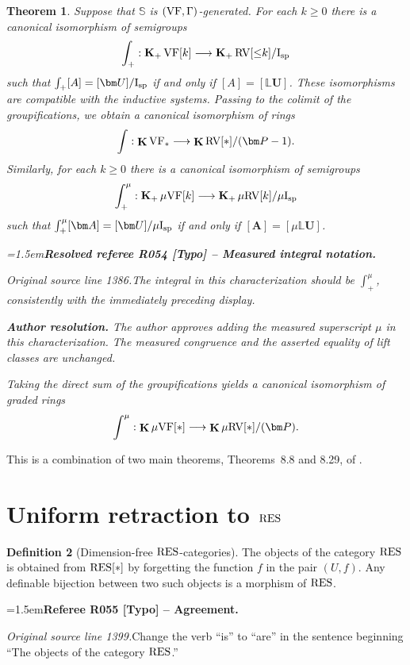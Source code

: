 \documentclass[12pt]{amsart}
\newcommand{\RefereeRemark}[4]{%
  \par\medskip\begingroup\normalfont\small\color{RefereePurple}%
  \emergencystretch=1.5em\noindent\textbf{Referee R#1 [#2] -- #3.}\par\nobreak\noindent #4\par
  \endgroup\medskip
}
\newcommand{\ResolvedRefereeRemark}[5]{%
  \par\medskip\begingroup\normalfont\small\color{gray}%
  \emergencystretch=1.5em\noindent\textbf{Resolved referee R#1 [#2] -- #3.}\par\nobreak\noindent #4\par
  \medskip\color{ResolutionGreen}\noindent\textbf{Author resolution.} #5\par
  \endgroup\medskip
}
\theoremstyle{plain}
\newtheorem{thm}{Theorem}[section]
\theoremstyle{definition}
\newtheorem{defn}[thm]{Definition}
\theoremstyle{remark}
\numberwithin{equation}{section}
\theoremstyle{plain}
\newcommand{\VF}{\textup{VF}}
\newcommand{\RV}{\textup{RV}}
\newcommand{\0}{\emptyset}
\newcommand{\bb}[1]{\mathbb{#1}}
\newcommand{\fun}{\longrightarrow}
\newcommand{\mgVF}{{\mu} {\VF}}
\newcommand{\mgRV}{{\mu}{\RV}}
\newcommand{\RES}{\textup{RES}}
\newcommand{\isp}{\textup{I}_{\textup{sp}}}
\newcommand{\mgisp}{\mu \isp}
\newcommand{\mgL}{{\mu}{\bb L}}
\DeclareMathOperator{\gsk}{\mathbf{K}_+}
\DeclareMathOperator{\ggk}{\mathbf{K}}
\begin{document}
\begin{thm}\label{main:prop:HK}
Suppose that $\mathbb{S}$ is $(\VF, \Gamma)$-generated. For each $k \geq 0$ there is a canonical isomorphism of semigroups
\[
\int_{+} : \gsk  \VF[k] \fun \gsk  \RV[{\leq}k] /  \isp
\]
such that $ \int_{+} [A] = [\bm U]/  \isp$ if and only if $[A] = [{\bb L}{\bm U}]$. These isomorphisms are  compatible with the inductive systems. Passing to  the colimit of the groupifications, we obtain a canonical isomorphism of rings
\[
\int : \ggk \VF_* \fun \ggk  \RV[*] /  (\bm P - 1).
\]
Similarly, for each $k \geq 0$ there is a canonical isomorphism of semigroups
\[
\int_{+}^\mu : \gsk  \mgVF[k] \fun \gsk  \mgRV[k] /  \mgisp
\]
such that $\int_{+}^{\mu} [\bm A] = [\bm U]/  \mgisp$  if and only if $[\bm A] = [{\mgL}{\bm U}]$.

\ResolvedRefereeRemark{054}{Typo}{Measured integral notation}{%
\textit{Original source line 1386.}\quad The integral in this characterization should be $\int_+^\mu$, consistently with the immediately preceding display.
}{The author approves adding the measured superscript $\mu$ in this characterization. The measured congruence and the asserted equality of lift classes are unchanged.}
Taking the direct sum of the groupifications yields a canonical isomorphism of graded rings
\[
\int^\mu : \ggk \mgVF[*] \fun \ggk  \mgRV[*] /  (\bm P).
\]
\end{thm}

This is a combination of two main theorems, Theorems~8.8 and 8.29, of \cite{hrushovski:kazhdan:integration:vf}.

\section{Uniform retraction to $\RES$}
\label{sec:retract}

\begin{defn}[Dimension-free $\RES$-categories]\label{df:res}
The objects of the category $\RES$ is obtained from $\RES[*]$ by forgetting the function $f$ in the pair $(U, f)$. Any definable bijection between two such objects is a morphism of $\RES$.

\RefereeRemark{055}{Typo}{Agreement}{%
\textit{Original source line 1399.}\quad Change the verb ``is'' to ``are'' in the sentence beginning ``The objects of the category $\RES$.''
}
\end{defn}
\end{document}
